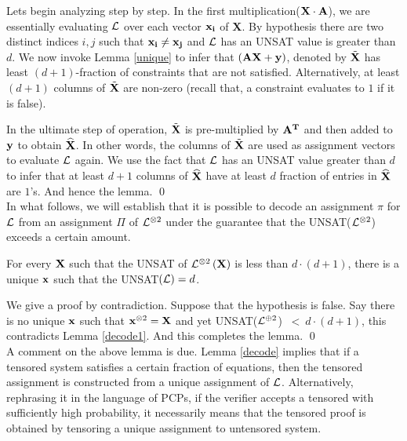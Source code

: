 {Lets begin analyzing step by step. In the first multiplication(${\bf X
  \cdot A}$), we are essentially evaluating ${\cal L}$ over each vector
${\bf x_i}$ of {\bf X}. By hypothesis there are two distinct indices
$i,j$ such that ${\bf x_i \ne x_j}$ and ${\cal L}$ has an UNSAT value is
greater than $d$.  We now invoke Lemma \ref{unique} to infer that
$\left({\bf A X} + {\bf y}\right)$, denoted by $\tilde{\bf X}$ has
least $(d+1)$-fraction of constraints that are not satisfied.
Alternatively, at least $\left(d +1\right)$ columns of $\tilde{\bf X}$
are non-zero (recall that, a constraint evaluates to $1$ if it is
false).

In the ultimate step of operation, $\tilde{\bf X}$ is pre-multiplied
by ${\bf A^T}$ and then added to ${\bf y}$ to obtain $\widehat{\bf X}$. In
other words, the columns of $\tilde{\bf X}$ are used as assignment
vectors to evaluate ${\cal L}$ again. We use the fact that ${\cal L}$ has an
UNSAT value greater than $d$ to infer that at least $d+1$ columns of
$\widehat{\bf X}$ have at least $d$ fraction of entries in $\widehat{\bf X}$
are $1$'s. And hence the lemma.  \qed \\


\noindent In what follows, we will establish that it is possible to
decode an assignment $\pi$ for ${\cal L}$ from an assignment $\Pi$ of
${\cal L}^{\otimes 2}$ under the guarantee that the UNSAT(${\cal L}^{\otimes
  2}$) exceeds a certain amount.


\begin{lemma}\label{decode}
  For every ${\bf X}$ such that the UNSAT of ${\cal L}^{\otimes
    2}\left({\bf X}\right)$ is less than $d \cdot (d+1)$, there is a
  unique ${\bf x}$ such that the UNSAT$\left({\cal L}\right) = d$.
\end{lemma}
 We give a proof by contradiction. Suppose that
the hypothesis is false. Say there is no unique ${\bf x}$ such that
${\bf x}^{\otimes 2} = {\bf X}$ and yet UNSAT(${\cal L}^{\oplus 2}$) $\ < \
d \cdot(d+1)$, this contradicts Lemma \ref{decode1}.  And this
completes the lemma. \qed \\



\noindent A comment on the above lemma is due. Lemma \ref{decode}
implies that if a tensored system satisfies a certain fraction of
equations, then the tensored assignment is constructed from a unique
assignment of ${\cal L}$.  Alternatively, rephrasing it in the language of
PCPs, if the verifier accepts a tensored with sufficiently high
probability, it necessarily means that the tensored proof is obtained
by tensoring a unique assignment to untensored system.

}
